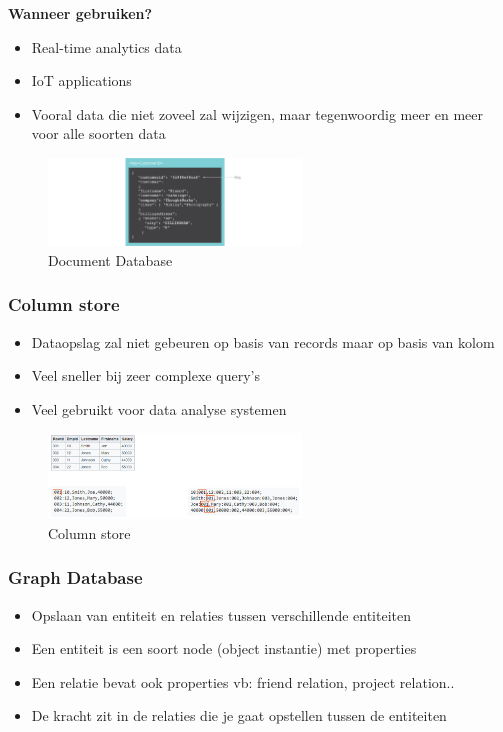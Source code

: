 \documentclass{article}
\newcommand{\bold}[1]{\textbf{#1}}
\begin{document}
\bold{Wanneer gebruiken?}

\begin{itemize}
    \item Real-time analytics data
    \item IoT applications
    \item Vooral data die niet zoveel zal wijzigen, maar tegenwoordig meer en meer voor alle soorten data
\end{itemize}

\begin{figure}[H]
    \centering
    \includegraphics[width=0.6\textwidth]{document-database.png}
    \caption{Document Database}
\end{figure}

\subsubsection{Column store}

\begin{itemize}
    \item Dataopslag zal niet gebeuren op basis van records maar op basis van kolom
    \item Veel sneller bij zeer complexe query's
    \item Veel gebruikt voor data analyse systemen
\end{itemize}

\begin{figure}[H]
    \centering
    \includegraphics[width=0.6\textwidth]{column-store.png}
    \caption{Column store}
\end{figure}

\subsubsection{Graph Database}

\begin{itemize}
    \item Opslaan van entiteit en relaties tussen verschillende entiteiten
    \item Een entiteit is een soort node (object instantie) met properties
    \item Een relatie bevat ook properties vb: friend relation, project relation..
    \item De kracht zit in de relaties die je gaat opstellen tussen de entiteiten
\end{itemize}
\end{document}
